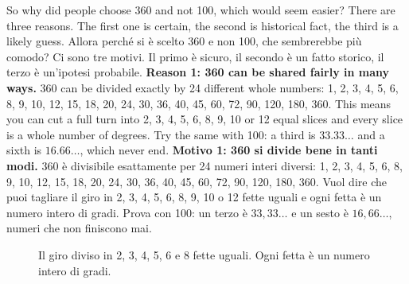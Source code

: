 \begin{bi}
So why did people choose 360 and not 100, which would seem easier? There are three reasons. The first one is certain, the second is historical fact, the third is a likely guess.
\IT
Allora perché si è scelto 360 e non 100, che sembrerebbe più comodo? Ci sono tre motivi. Il primo è sicuro, il secondo è un fatto storico, il terzo è un'ipotesi probabile.
\EN
\textbf{Reason 1: 360 can be shared fairly in many ways.} 360 can be divided exactly by 24 different whole numbers: 1, 2, 3, 4, 5, 6, 8, 9, 10, 12, 15, 18, 20, 24, 30, 36, 40, 45, 60, 72, 90, 120, 180, 360. This means you can cut a full turn into 2, 3, 4, 5, 6, 8, 9, 10 or 12 equal slices and every slice is a whole number of degrees. Try the same with 100: a third is $33.33\ldots$ and a sixth is $16.66\ldots$, which never end.
\IT
\textbf{Motivo 1: 360 si divide bene in tanti modi.} 360 è divisibile esattamente per 24 numeri interi diversi: 1, 2, 3, 4, 5, 6, 8, 9, 10, 12, 15, 18, 20, 24, 30, 36, 40, 45, 60, 72, 90, 120, 180, 360. Vuol dire che puoi tagliare il giro in 2, 3, 4, 5, 6, 8, 9, 10 o 12 fette uguali e ogni fetta è un numero intero di gradi. Prova con 100: un terzo è $33{,}33\ldots$ e un sesto è $16{,}66\ldots$, numeri che non finiscono mai.
\end{bi}

\begin{figure}[htbp]
\centering
%
      {Il giro diviso in 2, 3, 4, 5, 6 e 8 fette uguali. Ogni fetta è un numero intero di gradi.}
\label{fig:pizzas}
\end{figure}

